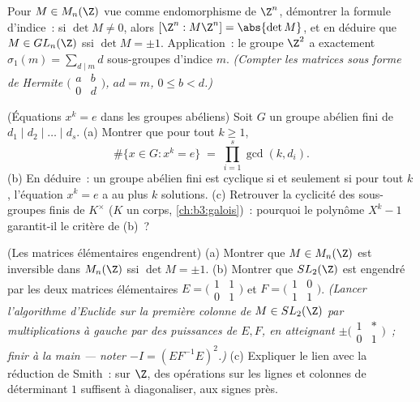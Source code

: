 \begin{exercise}[$\star\star\star$]\label{exo:b3:modules:10}
Pour $M \in M_n(\Z)$ vue comme endomorphisme de $\Z^n$,
démontrer la formule d'indice~: si $\det M \ne 0$, alors
$[\Z^n : M\Z^n] = \abs{\det M}$, et en déduire que $M \in
GL_n(\Z)$ ssi $\det M = \pm 1$. Application~: le groupe $\Z^2$ a
exactement $\sigma_1(m) = \sum_{d \mid m} d$ sous-groupes
d'indice $m$. \emph{(Compter les matrices sous forme de Hermite
$\bigl(\begin{smallmatrix} a & b\\ 0 & d\end{smallmatrix}\bigr)$,
$ad = m$, $0 \leq b < d$.)}
\end{exercise}

\begin{exercise}[$\star\star$]\label{exo:b3:modules:11}
(Équations $x^k = e$ dans les groupes abéliens) Soit $G$ un
groupe abélien fini de  $d_1 \mid d_2 \mid
\dots \mid d_s$.
(a) Montrer que pour tout $k \geq 1$,
\[
\#\{x \in G : x^k = e\} \;=\; \prod_{i=1}^{s}\gcd(k, d_i) .
\]
(b) En déduire~: un groupe abélien fini est cyclique si et
seulement si pour tout $k$, l'équation $x^k = e$ a au plus $k$
solutions.
(c) Retrouver la cyclicité des sous-groupes finis de $K^\times$
($K$ un corps, \cref{ch:b3:galois})~: pourquoi le polynôme $X^k
- 1$ garantit-il le critère de (b)~?
\end{exercise}

\begin{exercise}[$\star\star\star$]\label{exo:b3:modules:12}
(Les matrices élémentaires engendrent) (a) Montrer que $M \in
M_n(\Z)$ est inversible dans $M_n(\Z)$ ssi $\det M = \pm1$.
(b) Montrer que $SL_2(\Z)$ est engendré par les deux matrices
élémentaires $E = \bigl(\begin{smallmatrix}1 & 1\\ 0 &
1\end{smallmatrix}\bigr)$ et $F =
\bigl(\begin{smallmatrix}1 & 0\\ 1 & 1\end{smallmatrix}\bigr)$.
\emph{(Lancer l'algorithme d'Euclide sur la première colonne de
$M \in SL_2(\Z)$ par multiplications à gauche par des puissances
de $E, F$, en atteignant $\pm\bigl(\begin{smallmatrix}1 & *\\ 0
& 1\end{smallmatrix}\bigr)$~; finir à la main --- noter $-I =
(EF^{-1}E)^2$.)}
(c) Expliquer le lien avec la réduction de Smith~: sur $\Z$,
des opérations sur les lignes et colonnes de déterminant $1$
suffisent à diagonaliser, aux signes près.
\end{exercise}

